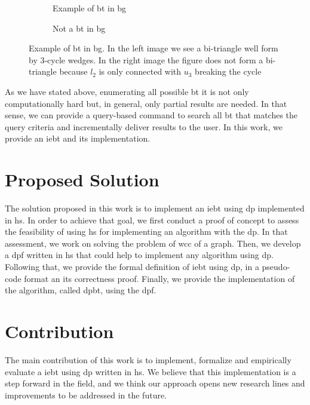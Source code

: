 \begin{figure}[htp!]
\begin{subfigure}[b]{0.5\textwidth}
\centering
{}
\caption{Example of \acrshort{bt} in \acrshort{bg}}
\label{fig:bitriangle-example}
\end{subfigure}
\begin{subfigure}[b]{0.5\textwidth}
\centering
{}
\caption{Not a \acrshort{bt} in \acrshort{bg}}
\label{fig:bitriangle-not}
\end{subfigure}
\caption[{[Int] Example of \acrshort{bt} in \acrshort{bg}}]{Example of \acrshort{bt} in \acrshort{bg}. In the left image we see a bi-triangle well form by 3-cycle wedges. In the right image the figure does not form a bi-triangle because $l_2$ is only connected with $u_3$ breaking the cycle}
\end{figure}

As we have stated above, enumerating all possible \acrshort{bt} it is not only computationally hard but, in general, only partial results are needed. In that sense, we can provide a query-based command to search all \acrshort{bt} that matches the query criteria and incrementally deliver results to the user. In this work, we provide an \acrfull{iebt} and its implementation. 

\section{Proposed Solution}
The solution proposed in this work is to implement an \acrfull{iebt} using \acrfull{dp} implemented in \acrfull{hs}.
In order to achieve that goal, we first conduct a proof of concept to assess the feasibility of using \acrshort{hs} for implementing an algorithm with the \acrshort{dp}. In that assessment, we work on solving the problem of \acrfull{wcc} of a graph. Then, we develop a \acrlong{dpf} written in \acrlong{hs} that could help to implement any algorithm using \acrshort{dp}.
Following that, we provide the formal definition of \acrshort{iebt} using \acrshort{dp}, in a pseudo-code format an its correctness proof.   Finally, we provide the implementation of the algorithm, called \acrfull{dpbt}, using the \acrshort{dpf}. 

\section{Contribution}\label{sec:contrib}
The main contribution of this work is to implement, formalize and empirically evaluate a \acrlong{iebt} using \acrlong{dp} written in \acrshort{hs}.
We believe that this implementation is a step forward in the field, and we think our approach opens new research lines and improvements to be addressed in the future. 

